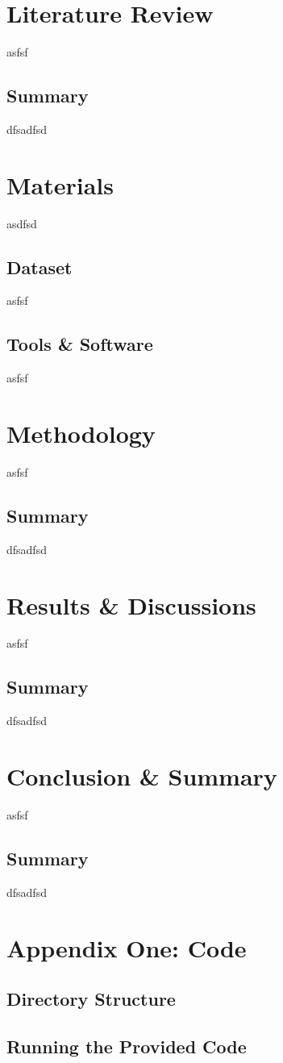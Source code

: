 \documentclass[twoside,11pt,a4paper]{article}
\begin{document}
\vfill
\clearpage
\section{Literature Review}
asfsf
\subsection{Summary}
dfsadfsd

\vfill
\clearpage
\section{Materials}
asdfsd
\subsection{Dataset}
asfsf
\subsection{Tools \& Software}
asfsf

\vfill
\clearpage
\section{Methodology}
asfsf
\subsection{Summary}
dfsadfsd

\vfill
\clearpage
\section{Results \& Discussions}
asfsf
\subsection{Summary}
dfsadfsd

\vfill
\clearpage
\section{Conclusion \& Summary}
asfsf
\subsection{Summary}
dfsadfsd

\vfill
\clearpage

\lhead{}\rhead{}
{}
 


\clearpage

\section{Appendix One: Code}

\subsection{Directory Structure}

\subsection{Running the Provided Code}

\clearpage
\end{document}
